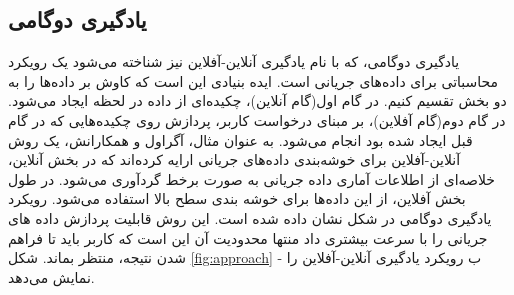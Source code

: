 \subsection{یادگیری دوگامی}
یادگیری دوگامی، که با نام یادگیری آنلاین-آفلاین نیز شناخته می‌شود یک رویکرد محاسباتی برای داده‌های جریانی است\cite{aggarwal2006framework}. ایده‌ بنیادی این است که کاوش بر داده‌ها را به دو بخش تقسیم کنیم. در گام اول(گام آنلاین)، چکیده‌ای از داده در لحظه ایجاد می‌شود. در گام دوم(گام آفلاین)، بر مبنای درخواست کاربر، پردازش روی چکیده‌هایی که در گام قبل ایجاد شده بود انجام می‌شود.
به عنوان مثال، آگراول
 و همکارانش\cite{aggarwal2003framework}، یک روش آنلاین-آفلاین برای خوشه‌بندی داده‌های جریانی ارایه کرده‌اند که در بخش آنلاین، خلاصه‌ای از اطلاعات آماری داده جریانی به صورت برخط گردآوری می‌شود. در طول بخش آفلاین، از این داده‌ها برای خوشه بندی سطح بالا استفاده می‌شود. رویکرد یادگیری دوگامی در شکل نشان داده شده است. این روش قابلیت پردازش داده های جریانی را با سرعت بیشتری داد منتها محدودیت آن این است که کاربر باید تا فراهم شدن نتیجه، منتظر بماند.
شکل
\ref{fig:approach}
- ب رویکرد یادگیری آنلاین-آفلاین را نمایش می‌دهد.





